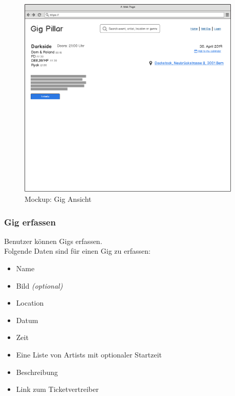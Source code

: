 \begin{figure}[!htb]
  \centering
  \includegraphics[width=0.95\textwidth]{mockups/event.png}
  \caption{Mockup: Gig Ansicht}
\end{figure}

\clearpage
\subsubsection{Gig erfassen}

Benutzer können Gigs erfassen.\\

\noindent
Folgende Daten sind für einen Gig zu erfassen:

\begin{itemize}
  \tightlist{}
  \item{} Name
  \item{} Bild \textit{(optional)}
  \item{} Location
  \item{} Datum
  \item{} Zeit
  \item{} Eine Liste von Artists mit optionaler Startzeit
  \item{} Beschreibung
  \item{} Link zum Ticketvertreiber
\end{itemize}

